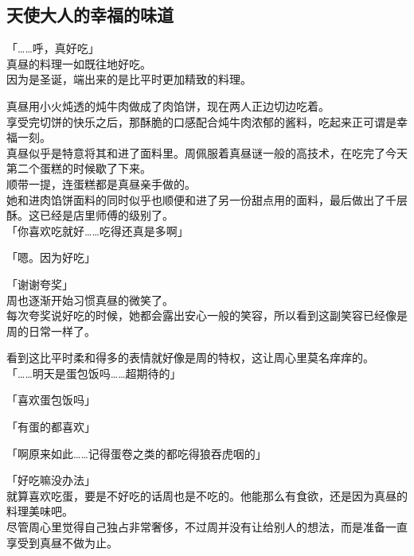 \subsection{天使大人的幸福的味道}

「……呼，真好吃」\\

真昼的料理一如既往地好吃。\\

因为是圣诞，端出来的是比平时更加精致的料理。

真昼用小火炖透的炖牛肉做成了肉馅饼，现在两人正边切边吃着。\\

享受完切饼的快乐之后，那酥脆的口感配合炖牛肉浓郁的酱料，吃起来正可谓是幸福一刻。\\

真昼似乎是特意将其和进了面料里。周佩服着真昼谜一般的高技术，在吃完了今天第二个蛋糕的时候歇了下来。\\

顺带一提，连蛋糕都是真昼亲手做的。\\

她和进肉馅饼面料的同时似乎也顺便和进了另一份甜点用的面料，最后做出了千层酥。这已经是店里师傅的级别了。\\

「你喜欢吃就好……吃得还真是多啊」

「嗯。因为好吃」

「谢谢夸奖」\\

周也逐渐开始习惯真昼的微笑了。\\

每次夸奖说好吃的时候，她都会露出安心一般的笑容，所以看到这副笑容已经像是周的日常一样了。

看到这比平时柔和得多的表情就好像是周的特权，这让周心里莫名痒痒的。\\

「……明天是蛋包饭吗……超期待的」

「喜欢蛋包饭吗」

「有蛋的都喜欢」

「啊原来如此……记得蛋卷之类的都吃得狼吞虎咽的」

「好吃嘛没办法」\\

就算喜欢吃蛋，要是不好吃的话周也是不吃的。他能那么有食欲，还是因为真昼的料理美味吧。\\

尽管周心里觉得自己独占非常奢侈，不过周并没有让给别人的想法，而是准备一直享受到真昼不做为止。\\

